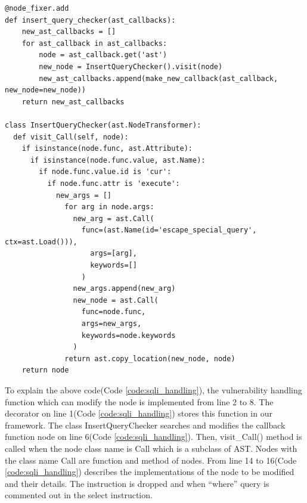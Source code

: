 \documentclass[conference]{IEEEtran}
\begin{document}
\begin{lstlisting}[caption={A vulnerable handling function which address a SQL injection.}, label=code:sqli_handling, captionpos=b]
@node_fixer.add
def insert_query_checker(ast_callbacks):
    new_ast_callbacks = []
    for ast_callback in ast_callbacks:
        node = ast_callback.get('ast')
        new_node = InsertQueryChecker().visit(node)
        new_ast_callbacks.append(make_new_callback(ast_callback, new_node=new_node))
    return new_ast_callbacks

class InsertQueryChecker(ast.NodeTransformer):
  def visit_Call(self, node):
    if isinstance(node.func, ast.Attribute):
      if isinstance(node.func.value, ast.Name):
        if node.func.value.id is 'cur':
          if node.func.attr is 'execute':
            new_args = []
              for arg in node.args:
                new_arg = ast.Call(
                  func=(ast.Name(id='escape_special_query', ctx=ast.Load())),
                    args=[arg],
                    keywords=[]
                  )
                new_args.append(new_arg)
                new_node = ast.Call(
                  func=node.func,
                  args=new_args,
                  keywords=node.keywords
                )
              return ast.copy_location(new_node, node)
    return node
\end{lstlisting}
To explain the above code(Code \ref{code:sqli_handling}), the vulnerability handling function which can modify the node is implemented from line 2 to 8.
The decorator on line 1(Code \ref{code:sqli_handling}) stores this function in our framework.
The class InsertQueryChecker searches and modifies the callback function node on line 6(Code \ref{code:sqli_handling}).
Then, visit\_Call() method is called when the node class name is Call which is a subclass of AST.
Nodes with the class name Call are function and method of nodes.
From line 14 to 16(Code \ref{code:sqli_handling}) describes the implementations of the node to be modified and their details.
The instruction is dropped and when “where” query is commented out in the select instruction.
\end{document}
